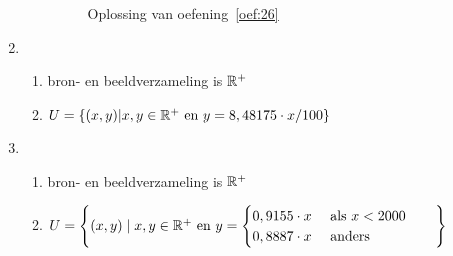 \begin{oef}
\begin{opl}
\begin{enumerate}
\begin{enumerate}
\begin{figure}[htbp]
                  \caption{Oplossing van oefening~\ref{oef:26}}\label{oef:opl26}
                \end{figure}
        \end{enumerate}
  \item \begin{enumerate}
          \item bron- en beeldverzameling is  $\mathbb{R}^+$
          \item $U=\{(x,y)|x,y\in \mathbb{R}^+\text{ en } y=8,48175\cdot x/100\}$
        \end{enumerate}
  \item \begin{enumerate}
          \item bron- en beeldverzameling is  $\mathbb{R}^+$
          \item $U = \left\lbrace (x,y)\;|\; x,y \in \mathbb{R}^+
                \text{ en } y = \begin{cases}
                                  0,9155\cdot x&\text{ als }x<2000\\
                                  0,8887\cdot x&\text{ anders }
                                \end{cases} \qquad \right\rbrace$
        \end{enumerate}

\end{enumerate}
\end{opl}
\end{oef}

